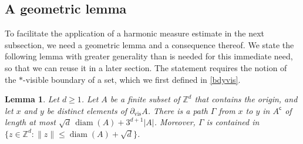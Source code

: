 \documentclass[11pt,reqno]{amsart}
\newtheorem{lemma}{Lemma}[section]
\theoremstyle{definition}
\numberwithin{equation}{section}
\newcommand{\Z}{\mathbb{Z}}
\newcommand{\1}{\mathbf{1}}
\DeclareMathOperator{\diam}{diam}
\newcommand{\bdyvis}{\partial_{\mathrm{vis}}}
\newcommand{\cc}{\mathsf{c}}
\begin{document}
\subsection{A geometric lemma}\label{sec geo}

To facilitate the application of a harmonic measure estimate in the next subsection, we need a geometric lemma and a consequence thereof. 
We state the following lemma with greater generality than is needed for this immediate need, so that we can reuse it in a later section. The statement requires the notion of the $\ast$-visible boundary of a set, which we first defined in \eqref{bdyvis}.

\begin{lemma}\label{kesten cor}
Let $d \geq 1$. Let $A$ be a finite subset of $\Z^d$ that contains the origin, and let $x$ and $y$ be distinct elements of $\bdyvis A$. There is a path $\Gamma$ from $x$ to $y$ in $A^\cc$ of length at most $\sqrt{d} \, \diam (A) + 3^{d+1} |A|$. Moreover, $\Gamma$ is contained in $\{z \in \Z^d: \|z\| \leq \diam (A) + \sqrt{d}\}$. 
\end{lemma}
\end{document}
